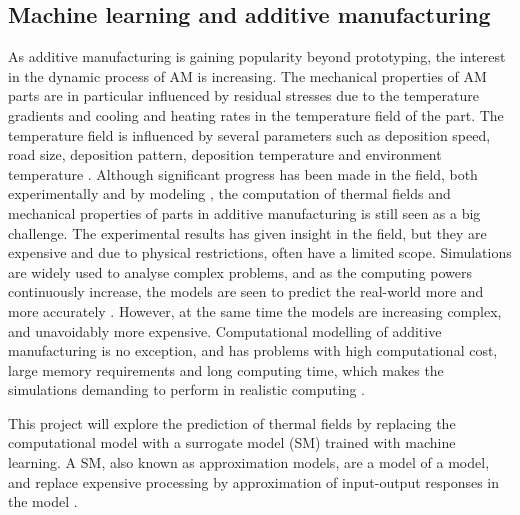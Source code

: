 \subsection{Machine learning and additive manufacturing}
\label{sec:ML+AM}
As additive manufacturing is gaining popularity beyond prototyping, the interest in the dynamic process of AM is increasing. The mechanical properties of AM parts are in particular influenced by residual stresses due to the temperature gradients and cooling and heating rates in the temperature field of the part. The temperature field is influenced by several parameters such as deposition speed, road size, deposition pattern, deposition temperature and environment temperature \cite{data_driven}. Although significant progress has been made in the field, both experimentally and by modeling , the computation of thermal fields and mechanical properties of parts in additive manufacturing is still seen as a big challenge. The experimental results has given insight in the field, but they are expensive and due to physical restrictions, often have a limited scope. Simulations are widely used to analyse complex problems, and as the computing powers continuously increase, the models are seen to predict the real-world more and more accurately \cite{SM}. However, at the same time the models are increasing complex, and unavoidably more expensive. Computational modelling of additive manufacturing is no exception, and has problems with high computational cost, large memory requirements and long computing time, which makes the simulations demanding to perform in realistic computing \cite{data_driven}.

This project will explore the prediction of thermal fields by replacing the computational model with a surrogate model (SM) trained with machine learning. A SM, also known as approximation models, are a model of a model, and replace expensive processing by approximation of input-output responses in the model \cite{SM}. 



